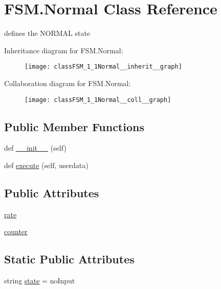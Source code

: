 \hypertarget{classFSM_1_1Normal}{}\section{F\+S\+M.\+Normal Class Reference}
\label{classFSM_1_1Normal}


defines the N\+O\+R\+M\+AL state  




Inheritance diagram for F\+S\+M.\+Normal\+:\nopagebreak
\begin{figure}[H]
\begin{center}
\leavevmode
\texttt{[image: classFSM\_1\_1Normal\_\_inherit\_\_graph]}
\end{center}
\end{figure}


Collaboration diagram for F\+S\+M.\+Normal\+:\nopagebreak
\begin{figure}[H]
\begin{center}
\leavevmode
\texttt{[image: classFSM\_1\_1Normal\_\_coll\_\_graph]}
\end{center}
\end{figure}
\subsection*{Public Member Functions}
\begin{DoxyCompactItemize}
\item 
def \hyperlink{classFSM_1_1Normal_a21e63c972c3a4b1417c60b5d18ea18bd}{\+\_\+\+\_\+init\+\_\+\+\_\+} (self)
\item 
def \hyperlink{classFSM_1_1Normal_ae85b3201d4649dac559f39d327f76f6e}{execute} (self, userdata)
\end{DoxyCompactItemize}
\subsection*{Public Attributes}
\begin{DoxyCompactItemize}
\item 
\hyperlink{classFSM_1_1Normal_a99ce5b8dddfae4e6a49f4c1d292b5d83}{rate}
\item 
\hyperlink{classFSM_1_1Normal_aeeb78ed66cc617acb7ac428aa2507b6d}{counter}
\end{DoxyCompactItemize}
\subsection*{Static Public Attributes}
\begin{DoxyCompactItemize}
\item 
string \hyperlink{classFSM_1_1Normal_a12ba58b7a0cac9ae3da6f13916150c7b}{state} = \textquotesingle{}no\+Input\textquotesingle{}
\end{DoxyCompactItemize}


